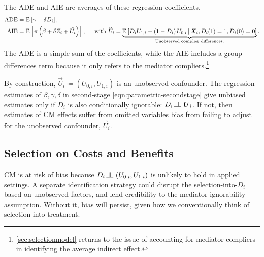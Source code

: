 The ADE and AIE are averages of these regression coefficients.
\begin{align*}
    \text{ADE}
        &= \mathbb{E}_{} \left[ \gamma + \delta D_i \right], \\
    \text{AIE}
        &= \mathbb{E}_{} \left[  \pi \left( \beta +  \delta Z_i + \widetilde{U}_i \right) \right],
        \;\;\;\; \text{ with } \widetilde{U}_i
            = \underbrace{\mathbb{E}_{} \left[  D_i U_{1,i} - \left(1 - D_i \right)U_{0,i} \, \middle\vert \, 
                \boldsymbol{\mathit{X}}_i, D_i(1) = 1, D_i(0) = 0 \right]}_{
                    \text{Unobserved complier differences.}}.
\end{align*}
The ADE is a simple sum of the coefficients, while the AIE includes a group differences term because it only refers to the mediator compliers.\footnote{
    \autoref{sec:selectionmodel} returns to the issue of accounting for mediator compliers in identifying the average indirect effect.
}

By construction, $\vec U_i \coloneqq \left(U_{0, i}, U_{1, i} \right)$ is an unobserved confounder.
The regression estimates of $\beta, \gamma, \delta$ in second-stage \eqref{eqn:parametric-secondstage} give unbiased estimates only if $D_i$ is also conditionally ignorable: $D_i \indep  \vec U_{i} $.
If not, then estimates of CM effects suffer from omitted variables bias from failing to adjust for the unobserved confounder, $\vec U_i$.

\subsection{Selection on Costs and Benefits}
CM is at risk of bias because $D_i \indep  \left(U_{0, i}, U_{1, i} \right)$ is unlikely to hold in applied settings.
A separate identification strategy could disrupt the selection-into-$D_i$ based on unobserved factors, and lend credibility to the mediator ignorability assumption.
Without it, bias will persist, given how we conventionally think of selection-into-treatment.

